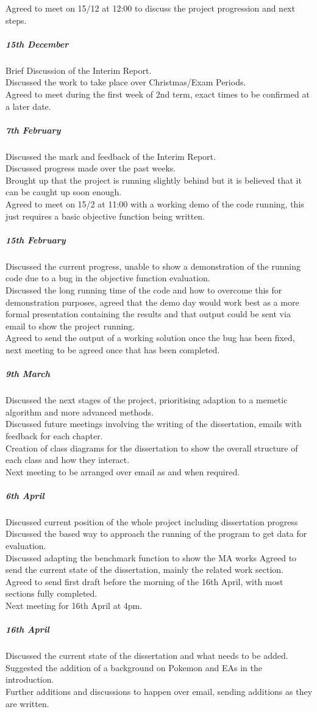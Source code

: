 \documentclass[a4paper]{article}
\begin{document}
Agreed to meet on 15/12 at 12:00 to discuss the project progression and next steps.
\subparagraph{15th December}
Brief Discussion of the Interim Report.\\
Discussed the work to take place over Christmas/Exam Periods.\\
Agreed to meet during the first week of 2nd term, exact times to be confirmed at a later date.
\subparagraph{7th February}
Discussed the mark and feedback of the Interim Report.\\
Discussed progress made over the past weeks.\\
Brought up that the project is running slightly behind but it is believed that it can be caught up soon enough.\\
Agreed to meet on 15/2 at 11:00 with a working demo of the code running, this just requires a basic objective function being written.
\subparagraph{15th February}
Discussed the current progress, unable to show a demonstration of the running code due to a bug in the objective function evaluation.\\
Discussed the long running time of the code and how to overcome this for demonstration purposes, agreed that the demo day would work best as a more formal presentation containing the results and that output could be sent via email to show the project running.\\
Agreed to send the output of a working solution once the bug has been fixed, next meeting to be agreed once that has been completed.
\subparagraph{9th March}
Discussed the next stages of the project, prioritising adaption to a memetic algorithm and more advanced methods.\\
Discussed future meetings involving the writing of the dissertation, emails with feedback for each chapter.\\
Creation of class diagrams for the dissertation to show the overall structure of each class and how they interact.\\
Next meeting to be arranged over email as and when required.
\subparagraph{6th April}
Discussed current position of the whole project including dissertation progress
Discussed the based way to approach the running of the program to get data for evaluation.\\
Discussed adapting the benchmark function to show the MA works
Agreed to send the current state of the dissertation, mainly the related work section.\\
Agreed to send first draft before the morning of the 16th April, with most sections fully completed.\\
Next meeting for 16th April at 4pm.
\subparagraph{16th April}
Discussed the current state of the dissertation and what needs to be added. \\
Suggested the addition of a background on Pokemon and EAs in the introduction. \\
Further additions and discussions to happen over email, sending additions as they are written.
\end{document}
